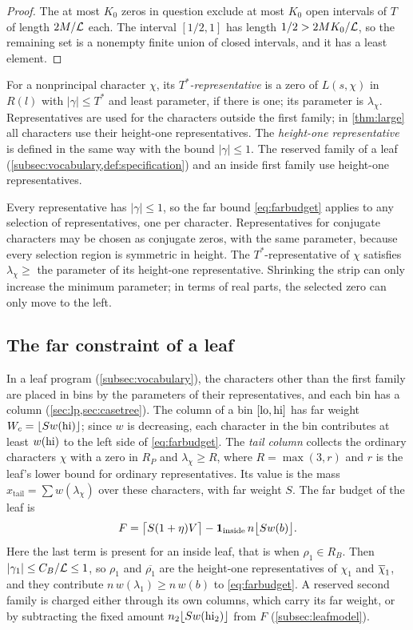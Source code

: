 \begin{proof}
The at most $K_0$ zeros in question exclude at most $K_0$ open intervals of $T$ of length $2M/\mathcal{L}$
each. The interval $[1/2,1]$ has length $1/2>2MK_0/\mathcal{L}$, so the remaining set is a nonempty
finite union of closed intervals, and it has a least element.
\end{proof}

\begin{definition}[Representatives]\label{def:representative}
For a nonprincipal character $\chi$, its \emph{$T^*$-representative} is a zero of $L(s,\chi)$ in
$R(l)$ with $|\gamma|\le T^*$ and least parameter, if there is one; its parameter is $\lambda_\chi$.
Representatives are used for the characters outside the first family; in \cref{thm:large} all
characters use their height-one representatives. The \emph{height-one representative} is defined in the same way with the bound
$|\gamma|\le1$. The reserved family of a leaf (\cref{subsec:vocabulary,def:specification}) and an inside first family use
height-one representatives.
\end{definition}

Every representative has $|\gamma|\le1$, so the far bound \eqref{eq:farbudget} applies to any
selection of representatives, one per character. Representatives for conjugate characters
may be chosen as conjugate zeros, with the same parameter, because every selection
region is symmetric in height.
The $T^*$-representative of $\chi$ satisfies $\lambda_\chi\ge$ the parameter of its height-one
representative. Shrinking the strip can only increase the minimum parameter; in terms
of real parts, the selected zero can only move to the left.

\subsection{The far constraint of a leaf}
In a leaf program (\cref{subsec:vocabulary}), the characters other than the first family are placed
in bins by the parameters of their representatives, and each bin has a column
(\cref{sec:lp,sec:casetree}). The column of a bin $[\mathrm{lo},\mathrm{hi}]$ has far weight
$W_c=\lfloor Sw(\mathrm{hi})\rfloor$; since $w$ is decreasing, each character in the bin contributes at least
$w(\mathrm{hi})$ to the left side of \eqref{eq:farbudget}. The
\emph{tail column} collects the ordinary characters $\chi$ with a zero in $R_P$ and $\lambda_\chi\ge R$, where
$R=\max(3,r)$ and $r$ is the leaf's lower bound for ordinary representatives. Its value is the mass
$x_{\mathrm{tail}}=\sum w(\lambda_\chi)$ over these characters, with far weight $S$. The far budget of
the leaf is
\[
  F=\bigl\lceil S(1+\eta)V\bigr\rceil-\mathbf{1}_{\mathrm{inside}}\,n\bigl\lfloor Sw(b)\bigr\rfloor .
\]
Here the last term is present for an inside leaf, that is when $\rho_1\in R_B$. Then
$|\gamma_1|\le C_B/\mathcal{L}\le1$, so $\rho_1$ and $\overline{\rho_1}$ are the height-one representatives of $\chi_1$ and
$\overline{\chi}_1$, and they contribute $n\,w(\lambda_1)\ge n\,w(b)$ to \eqref{eq:farbudget}. A reserved second family is charged either through its own columns, which carry its far
weight, or by subtracting the fixed amount $n_2\lfloor Sw(\mathrm{hi}_2)\rfloor$ from $F$ (\cref{subsec:leafmodel}).
